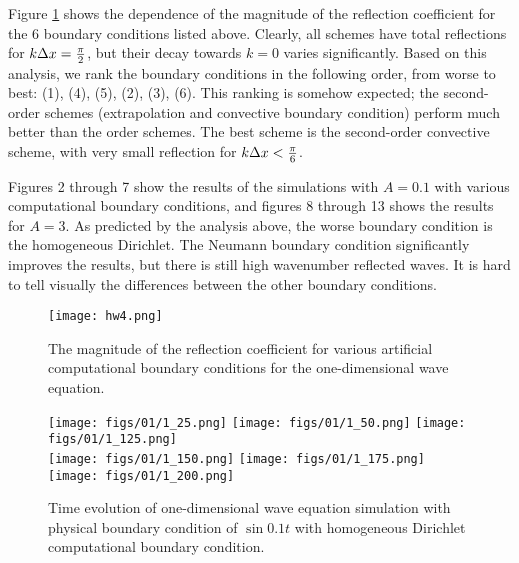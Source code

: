 \documentclass[11pt]{article}
\begin{document}
\begin{enumerate}
    Figure \ref{fig:bcs} shows the dependence of the magnitude of the reflection coefficient for the 6 boundary 
    conditions listed above. Clearly, all schemes have total reflections for $k\Delta x = \tfrac{\pi}{2}$, but their
    decay towards $k = 0$ varies significantly. Based on this analysis, we rank the boundary conditions in the 
    following order, from worse to best: (1), (4), (5), (2), (3), (6). This ranking is somehow expected; the
    second-order schemes (extrapolation and convective boundary condition) perform much better than the order
    schemes. The best scheme is the second-order convective scheme, with very small reflection for 
    $k \Delta x < \tfrac{\pi}{6}$. 

    Figures 2 through 7 show the results of the simulations with $A = 0.1$ with various computational boundary 
    conditions, and figures 8 through 13 shows the results for $A=3$. As predicted by the analysis above, the
    worse boundary condition is the homogeneous Dirichlet. The Neumann boundary condition significantly improves
    the results, but there is still high wavenumber reflected waves. It is hard to tell visually the differences
    between the other boundary conditions.

         \begin{figure}[ht]
        \begin{center}
        \texttt{[image: hw4.png]}\\
        \end{center}
        \caption{The magnitude of the reflection coefficient for various artificial computational boundary conditions for the one-dimensional wave equation.}
        \label{fig:bcs}
        \end{figure}

        \begin{figure}[ht]
        \begin{center}
        \texttt{[image: figs/01/1\_25.png]}
        \texttt{[image: figs/01/1\_50.png]}
        \texttt{[image: figs/01/1\_125.png]}\\
        \texttt{[image: figs/01/1\_150.png]}
        \texttt{[image: figs/01/1\_175.png]}
        \texttt{[image: figs/01/1\_200.png]}\\
        \end{center}
        \caption{Time evolution of one-dimensional wave equation simulation with physical boundary condition
                of $\sin 0.1 t$ with homogeneous Dirichlet computational boundary condition.}
        \label{fig2_1}
        \end{figure}


\end{enumerate}
\end{document}
